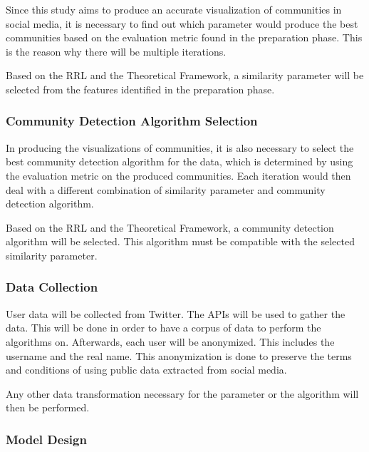 Since this study aims to produce an accurate visualization of communities in social media, it is necessary to find out which parameter would produce the best communities based on the evaluation metric found in the preparation phase. This is the reason why there will be multiple iterations. 




Based on the RRL and the Theoretical Framework, a similarity parameter will be selected from the features identified in the preparation phase.




\subsubsection{Community Detection Algorithm Selection}




In producing the visualizations of communities, it is also necessary to select the best community detection algorithm for the data, which is determined by using the evaluation metric on the produced communities. Each iteration would then deal with a different combination of similarity parameter and community detection algorithm.




Based on the RRL and the Theoretical Framework, a community detection algorithm will be selected. This algorithm must be compatible with the selected similarity parameter.




\subsubsection{Data Collection}




User data will be collected from Twitter. The API\vtick s will be used to gather the data. This will be done in order to have a corpus of data to perform the algorithms on. Afterwards, each user will be anonymized. This includes the username and the real name.  This anonymization is done to preserve the terms and conditions of using public data extracted from social media. 




Any other data transformation necessary for the parameter or the algorithm will then be performed.




\subsubsection{Model Design}




